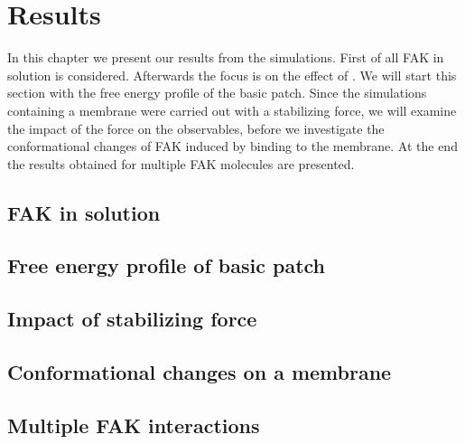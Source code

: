 \chapter{Results}
In this chapter we present our results from the simulations. First of all FAK in solution is considered. Afterwards the focus is on the effect of \pip{}. We will start this section with the free energy profile of the basic patch. Since the simulations containing a membrane were carried out with a stabilizing force, we will examine the impact of the force on the observables, before we investigate the conformational changes of FAK induced by binding to the membrane. At the end the results obtained for multiple FAK molecules are presented.
%
%
\section{FAK in solution}

%
%
\section{Free energy profile of basic patch}

%
%
\section{Impact of stabilizing force}

%
%
\section{Conformational changes on a membrane}

%
%
\section{Multiple FAK interactions}

